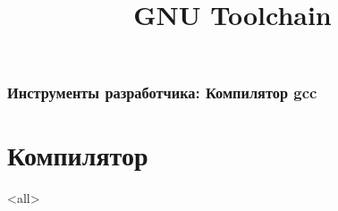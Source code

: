 
\title[toolchain]{GNU Toolchain}




\begin{frame}
	\frametitle{Инструменты разработчика: Компилятор gcc}
	\titlepage
	\vspace{-0.5cm}
	\begin{center}
	\end{center}
\end{frame}

\begin{frame}
	\tableofcontents
\end{frame}



\section{Компилятор}

\mode<all>{}




